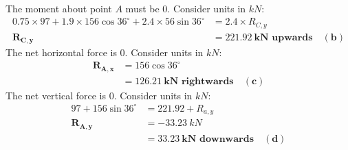 \documentclass{article}
\begin{document}
The moment about point $A$ must be 0. Consider units in $kN$:
\begin{align*}
    0.75\times 97 + 1.9\times 156\cos 36^\circ + 2.4\times 56\sin 36^\circ & = 2.4\times R_{C,y}                          \\
    \mathbf{R_{C,y}}                                                       & = \mathbf{221.92\ kN\text{ upwards}\quad(b)}
\end{align*}
The net horizontal force is 0. Consider units in $kN$:
\begin{align*}
    \mathbf{R_{A,x}} & = 156\cos 36^\circ                              \\
                     & = \mathbf{126.21\ kN\text{ rightwards}\quad(c)}
\end{align*}
The net vertical force is 0. Consider units in $kN$:
\begin{align*}
    97 + 156\sin 36^\circ & = 221.92 + R_{a,y}                            \\
    \mathbf{R_{A,y}}      & = -33.23\ kN                                  \\
                          & = \mathbf{33.23\ kN\text{ downwards}\quad(d)}
\end{align*}
\end{document}
